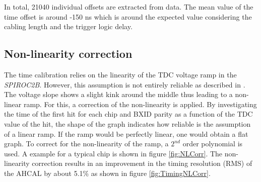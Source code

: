 \documentclass{JINST}
\begin{document}
In total, 21040 individual offsets are extracted from data. The mean value of the time offset is around -150 ns which is around the expected value considering the cabling length and the trigger logic delay.

\subsection{Non-linearity correction}

The time calibration relies on the linearity of the TDC voltage ramp in the \textit{SPIROC2B}. However, this assumption is not entirely reliable as described in \cite{Hartbrich2011, Brianne2012}. The voltage slope shows a slight kink around the middle thus leading to a non-linear ramp. For this, a correction of the non-linearity is applied. By investigating the time of the first hit for each chip and BXID parity as a function of the TDC value of the hit, the shape of the graph indicates how reliable is the assumption of a linear ramp. If the ramp would be perfectly linear, one would obtain a flat graph. To correct for the non-linearity of the ramp, a $2^{nd}$ order polynomial is used. A example for a typical chip is shown in figure \ref{fig:NLCorr}. The non-linearity correction results in an improvement in the timing resolution (RMS) of the AHCAL by about 5.1\% as shown in figure \ref{fig:TimingNLCorr}.
\end{document}
